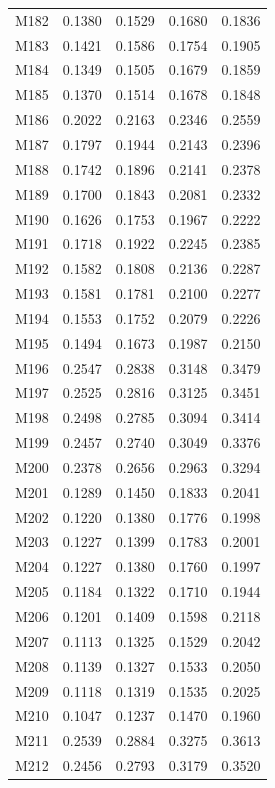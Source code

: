 \begin{longtable}{lrrrr}
M182 & 0.1380 & 0.1529 & 0.1680 & 0.1836 \\
M183 & 0.1421 & 0.1586 & 0.1754 & 0.1905 \\
M184 & 0.1349 & 0.1505 & 0.1679 & 0.1859 \\
M185 & 0.1370 & 0.1514 & 0.1678 & 0.1848 \\
M186 & 0.2022 & 0.2163 & 0.2346 & 0.2559 \\
M187 & 0.1797 & 0.1944 & 0.2143 & 0.2396 \\
M188 & 0.1742 & 0.1896 & 0.2141 & 0.2378 \\
M189 & 0.1700 & 0.1843 & 0.2081 & 0.2332 \\
M190 & 0.1626 & 0.1753 & 0.1967 & 0.2222 \\
M191 & 0.1718 & 0.1922 & 0.2245 & 0.2385 \\
M192 & 0.1582 & 0.1808 & 0.2136 & 0.2287 \\
M193 & 0.1581 & 0.1781 & 0.2100 & 0.2277 \\
M194 & 0.1553 & 0.1752 & 0.2079 & 0.2226 \\
M195 & 0.1494 & 0.1673 & 0.1987 & 0.2150 \\
M196 & 0.2547 & 0.2838 & 0.3148 & 0.3479 \\
M197 & 0.2525 & 0.2816 & 0.3125 & 0.3451 \\
M198 & 0.2498 & 0.2785 & 0.3094 & 0.3414 \\
M199 & 0.2457 & 0.2740 & 0.3049 & 0.3376 \\
M200 & 0.2378 & 0.2656 & 0.2963 & 0.3294 \\
M201 & 0.1289 & 0.1450 & 0.1833 & 0.2041 \\
M202 & 0.1220 & 0.1380 & 0.1776 & 0.1998 \\
M203 & 0.1227 & 0.1399 & 0.1783 & 0.2001 \\
M204 & 0.1227 & 0.1380 & 0.1760 & 0.1997 \\
M205 & 0.1184 & 0.1322 & 0.1710 & 0.1944 \\
M206 & 0.1201 & 0.1409 & 0.1598 & 0.2118 \\
M207 & 0.1113 & 0.1325 & 0.1529 & 0.2042 \\
M208 & 0.1139 & 0.1327 & 0.1533 & 0.2050 \\
M209 & 0.1118 & 0.1319 & 0.1535 & 0.2025 \\
M210 & 0.1047 & 0.1237 & 0.1470 & 0.1960 \\
M211 & 0.2539 & 0.2884 & 0.3275 & 0.3613 \\
M212 & 0.2456 & 0.2793 & 0.3179 & 0.3520 \\

\end{longtable}
